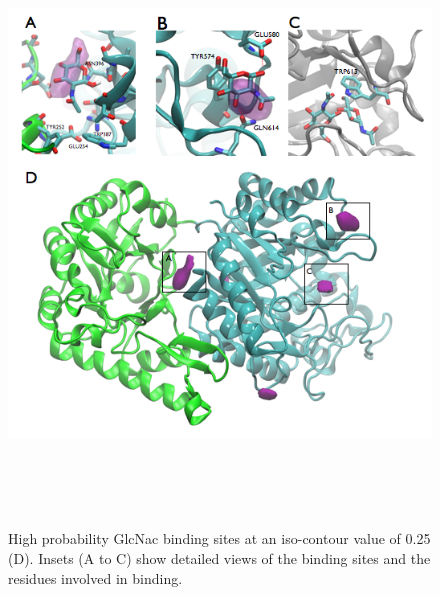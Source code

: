 \begin{figure}[pgab_binding_sites]
\centering
\includegraphics[height=6.29in, width=6.12in]{figures/results4/figure_pgab_binding_sites.png}
\caption[GlcNac binding sites]{High probability GlcNac binding sites at an iso-contour value of 0.25 (D). Insets (A to C) show detailed views of the binding sites and the residues involved in binding.}
\label{fig:pgab_binding_sites}
\end{figure}

\begin{singlespace}


\end{singlespace}



